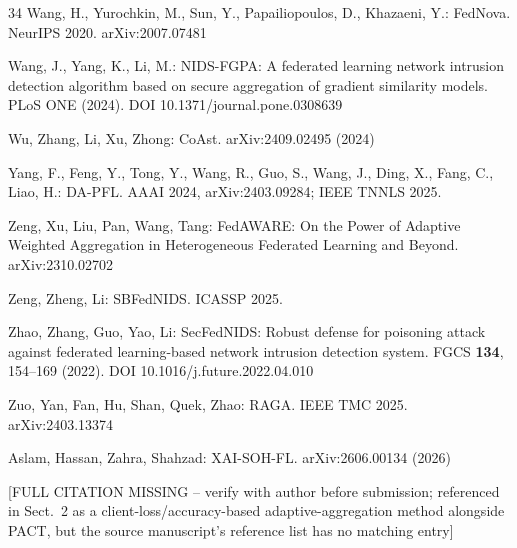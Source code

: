 \documentclass{llncs}
\begin{document}
\begin{thebibliography}{34}
 Wang, H., Yurochkin, M., Sun, Y., Papailiopoulos, D., Khazaeni, Y.: FedNova. NeurIPS 2020. arXiv:2007.07481

 Wang, J., Yang, K., Li, M.: NIDS-FGPA: A federated learning network intrusion detection algorithm based on secure aggregation of gradient similarity models. PLoS ONE (2024). DOI 10.1371/journal.pone.0308639

 Wu, Zhang, Li, Xu, Zhong: CoAst. arXiv:2409.02495 (2024)

 Yang, F., Feng, Y., Tong, Y., Wang, R., Guo, S., Wang, J., Ding, X., Fang, C., Liao, H.: DA-PFL. AAAI 2024, arXiv:2403.09284; IEEE TNNLS 2025.

 Zeng, Xu, Liu, Pan, Wang, Tang: FedAWARE: On the Power of Adaptive Weighted Aggregation in Heterogeneous Federated Learning and Beyond. arXiv:2310.02702

 Zeng, Zheng, Li: SBFedNIDS. ICASSP 2025.

 Zhao, Zhang, Guo, Yao, Li: SecFedNIDS: Robust defense for poisoning attack against federated learning-based network intrusion detection system. FGCS \textbf{134}, 154--169 (2022). DOI 10.1016/j.future.2022.04.010

 Zuo, Yan, Fan, Hu, Shan, Quek, Zhao: RAGA. IEEE TMC 2025. arXiv:2403.13374

 Aslam, Hassan, Zahra, Shahzad: XAI-SOH-FL. arXiv:2606.00134 (2026)

 [FULL CITATION MISSING -- verify with author before submission; referenced in Sect.~2 as a client-loss/accuracy-based adaptive-aggregation method alongside PACT, but the source manuscript's reference list has no matching entry]

\end{thebibliography}
\end{document}
